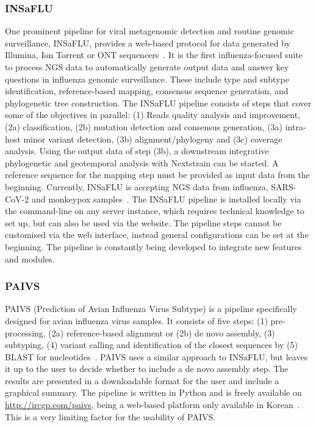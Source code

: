 \subsubsection{INSaFLU}
One prominent pipeline for viral metagenomic detection and routine genomic surveillance, \ac{INSaFLU}, provides a web-based protocol for data generated by Illumina, Ion Torrent or \ac{ONT} sequencers~\cite{borges2018insaflu}. It is the first influenza-focused suite to process \ac{NGS} data to automatically generate output data and answer key questions in influenza genomic surveillance. These include type and subtype identification, reference-based mapping, consensus sequence generation, and phylogenetic tree construction. The \ac{INSaFLU} pipeline consists of steps that cover some of the objectives in parallel: (1) Reads quality analysis and improvement, (2a) classification, (2b) mutation detection and consensus generation, (3a) intra-host minor variant detection, (3b) alignment/phylogeny and (3c) coverage analysis. Using the output data of step (3b), a downstream integrative phylogenetic and geotemporal analysis with Nextstrain can be started. A reference sequence for the mapping step must be provided as input data from the beginning. Currently, \ac{INSaFLU} is accepting \ac{NGS} data from influenza, \ac{SARS-CoV-2} and monkeypox samples~\cite{borges2018insaflu}. The \ac{INSaFLU} pipeline is installed locally via the command-line on any server instance, which requires technical knowledge to set up, but can also be used via the website. The pipeline steps cannot be customised via the web interface, instead general configurations can be set at the beginning. The pipeline is constantly being developed to integrate new features and modules.

\subsubsection{PAIVS}
\ac{PAIVS} (Prediction of Avian Influenza Virus Subtype) is a pipeline specifically designed for avian influenza virus samples. It consists of five steps: (1) pre-processing, (2a) reference-based alignment or (2b) de novo assembly, (3) subtyping, (4) variant calling and identification of the closest sequences by (5) \ac{BLAST} for nucleotides~\cite{park2020paivs}. \ac{PAIVS} uses a similar approach to \ac{INSaFLU}, but leaves it up to the user to decide whether to include a de novo assembly step. The results are presented in a downloadable format for the user and include a graphical summary. The pipeline is written in Python and is freely available on \url{http://ircgp.com/paivs}, being a web-based platform only available in Korean~\cite{park2020paivs}. This is a very limiting factor for the usability of \ac{PAIVS}.

